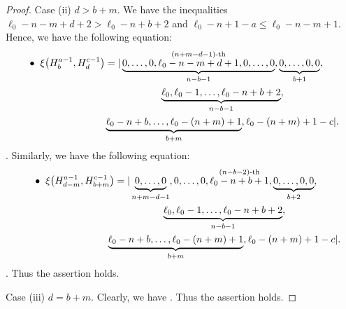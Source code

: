 \documentclass[10pt,a4paper]{amsart}
\numberwithin{equation}{section}
\begin{document}
\begin{proof}
Case (ii) $d>b+m$.
We have the inequalities $\ell_0-n-m+d+2>\ell_0-n+b+2$ and $\ell_0-n+1-a\leq \ell_0-n-m+1$. Hence, we have the following equation:
\begin{gather*}
\hspace{-3.85mm}\bullet\hspace{2mm}
\xi\bigl(H^{a-1}_{b},H^{c-1}_{d}\bigr)=|\underbrace{0,\dots,0,%
\stackrel{(n+m-d-1)\text{-th}}{\ell_0-n-m+d+1},0,\dots,0}_{n-b-1},\underbrace{0,\dots,0,0}_{b+1},\\
\hphantom{\hspace{-3.85mm}\bullet\hspace{2mm}\xi\bigl(H^{a-1}_{b},H^{c-1}_{d}\bigr)=|}{}
\underbrace{\ell_{0},\ell_{0}-1,\dots,\ell_{0}-n+b+2}_{n-b-1},\\
\hphantom{\hspace{-3.85mm}\bullet\hspace{2mm}\xi\bigl(H^{a-1}_{b},H^{c-1}_{d}\bigr)=|}{}
\underbrace{\ell_{0}-n+b,\dots,\ell_{0}-(n+m)+1}_{b+m},\ell_{0}-(n+m)+1-c|.%
\end{gather*}
. Similarly, we have the following equation:
\begin{gather*}
\hspace{-3.85mm}\bullet\hspace{2mm}
\xi\bigl(H^{a-1}_{d-m},H^{c-1}_{b+m}\bigr)=|\underbrace{0,\dots,0}_{n+m-d-1},%
0,\dots,0,\stackrel{(n-b-2)\text{-th}}{\ell_0-n+b+1},\underbrace{0,\dots,0,0}_{b+2},\nonumber\\
\hphantom{\xi\bigl(H^{a-1}_{d-m},H^{c-1}_{b+m}\bigr)=|}{}
\underbrace{\ell_{0},\ell_{0}-1,\dots,\ell_{0}-n+b+2}_{n-b-1},\\
\hphantom{\xi\bigl(H^{a-1}_{d-m},H^{c-1}_{b+m}\bigr)=|}{}
\underbrace{\ell_{0}-n+b,\dots,\ell_{0}-(n+m)+1}_{b+m},\ell_{0}-(n+m)+1-c|.%
\end{gather*}
. Thus the assertion holds.

Case (iii) $d=b+m$. Clearly, we have . Thus the assertion holds.


\end{proof}
\end{document}
